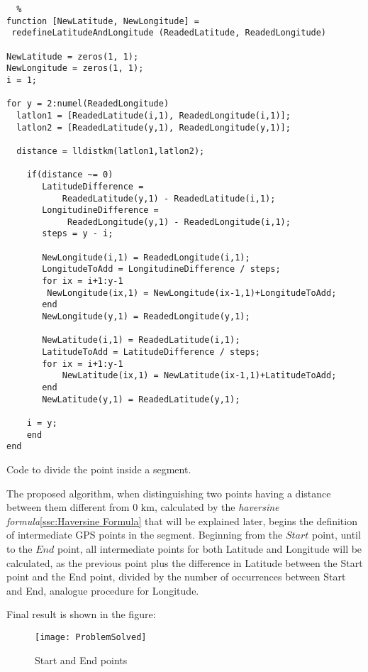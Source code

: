 \documentclass[tesi]{subfiles}
\begin{document}
\label{alg:Redefine Latitude And Longitude}
\lstset{language=Matlab}          %
\begin{lstlisting}  % 
function [NewLatitude, NewLongitude] =
 redefineLatitudeAndLongitude (ReadedLatitude, ReadedLongitude)

NewLatitude = zeros(1, 1);
NewLongitude = zeros(1, 1);
i = 1;
    
for y = 2:numel(ReadedLongitude)    
  latlon1 = [ReadedLatitude(i,1), ReadedLongitude(i,1)];
  latlon2 = [ReadedLatitude(y,1), ReadedLongitude(y,1)];
  
  distance = lldistkm(latlon1,latlon2);   

    if(distance ~= 0)    
       LatitudeDifference = 
           ReadedLatitude(y,1) - ReadedLatitude(i,1);
       LongitudineDifference =
            ReadedLongitude(y,1) - ReadedLongitude(i,1);
       steps = y - i;
   
       NewLongitude(i,1) = ReadedLongitude(i,1);
       LongitudeToAdd = LongitudineDifference / steps;
       for ix = i+1:y-1
        NewLongitude(ix,1) = NewLongitude(ix-1,1)+LongitudeToAdd;
       end       
       NewLongitude(y,1) = ReadedLongitude(y,1);
       
       NewLatitude(i,1) = ReadedLatitude(i,1);
       LatitudeToAdd = LatitudeDifference / steps;
       for ix = i+1:y-1
           NewLatitude(ix,1) = NewLatitude(ix-1,1)+LatitudeToAdd;
       end
       NewLatitude(y,1) = ReadedLatitude(y,1);   
    
    i = y;
    end
end 
\end{lstlisting}
\begin{center}
Code to divide the point inside a segment.
\end{center}
The proposed algorithm, when distinguishing two points having a distance between them different from $0$ $\si{\km}$, calculated by the \textit{haversine formula}\ref{ssc:Haversine Formula} that will be explained later, begins the definition of intermediate GPS points in the segment.
Beginning from the $Start$ point, until to the $End$ point, all intermediate points for both Latitude and Longitude will be calculated, as the previous point plus the difference in Latitude between the Start point and the End point, divided by the number of occurrences between Start and End, analogue procedure for Longitude.

Final result is shown in the figure:

\begin{figure}[H]	
\centering
\texttt{[image: ProblemSolved]} \label{Solved GPS Points Problem}
 \caption{Start and End points}
  \label{fig:Solved GPS Points Problem}
\end{figure}
\clearpage
\end{document}
